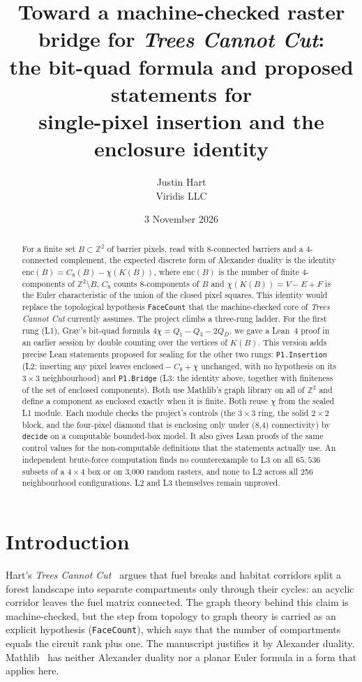 \documentclass[11pt]{article}
\title{Toward a machine-checked raster bridge for \emph{Trees Cannot Cut}:\\
the bit-quad formula and proposed statements for\\
single-pixel insertion and the enclosure identity}
\author{Justin Hart\\Viridis LLC}
\date{3 November 2026}
\theoremstyle{definition}
\theoremstyle{remark}
\begin{document}
\maketitle

\begin{abstract}
For a finite set $B\subset\mathbb{Z}^2$ of barrier pixels, read with
8-connected barriers and a 4-connected complement, the expected discrete form of
Alexander duality is the identity
$\mathrm{enc}(B) = C_8(B)-\chi(K(B))$, where $\mathrm{enc}(B)$ is the number
of finite 4-components of $\mathbb{Z}^2\setminus B$, $C_8$ counts 8-components of $B$ and $\chi(K(B))=V-E+F$ is the Euler
characteristic of the union of the closed pixel squares. This identity would
replace the topological hypothesis \texttt{FaceCount} that the machine-checked
core of \emph{Trees Cannot Cut} currently assumes. The project climbs a
three-rung ladder. For the first rung (L1), Gray's bit-quad formula
$4\chi = Q_1-Q_3-2Q_D$, we gave a Lean~4 proof in an earlier session by
double counting over the vertices of $K(B)$. This version adds precise Lean
statements proposed for sealing for the other two rungs: \texttt{P1.Insertion}
(L2: inserting any pixel leaves $\text{enclosed}-C_8+\chi$ unchanged, with no
hypothesis on its $3\times3$ neighbourhood) and \texttt{P1.Bridge} (L3: the
identity above, together with finiteness of the set of enclosed components).
Both use Mathlib's graph library on all of $\mathbb{Z}^2$ and define a component
as enclosed exactly when it is finite. Both reuse $\chi$ from the sealed L1
module. Each module checks the project's controls (the $3\times3$ ring, the
solid $2\times2$ block, and the four-pixel diamond that is enclosing only under
(8,4) connectivity) by \texttt{decide} on a computable bounded-box model. It also
gives Lean proofs of the same control values for the non-computable definitions
that the statements actually use. An independent brute-force computation finds
no counterexample to L3 on all $65{,}536$ subsets of a $4\times4$ box or on
3{,}000 random rasters, and none to L2 across all 256 neighbourhood
configurations. L2 and L3 themselves remain unproved.
\end{abstract}

\section{Introduction}

Hart's \emph{Trees Cannot Cut}~\cite{Hart2026} argues that fuel breaks and
habitat corridors split a forest landscape into separate compartments only
through their cycles: an acyclic corridor leaves the fuel matrix connected. The
graph theory behind this claim is machine-checked, but the step from topology to
graph theory is carried as an explicit hypothesis (\texttt{FaceCount}), which
says that the number of compartments equals the circuit rank plus one. The
manuscript justifies it by Alexander duality. Mathlib~\cite{Mathlib2020} has
neither Alexander duality nor a planar Euler formula in a form that applies
here.
\end{document}
